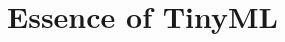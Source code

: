 \documentclass[../main]{subfiles}
\begin{document}
\chapter{Essence of TinyML} \label{chp:}
\end{document}
